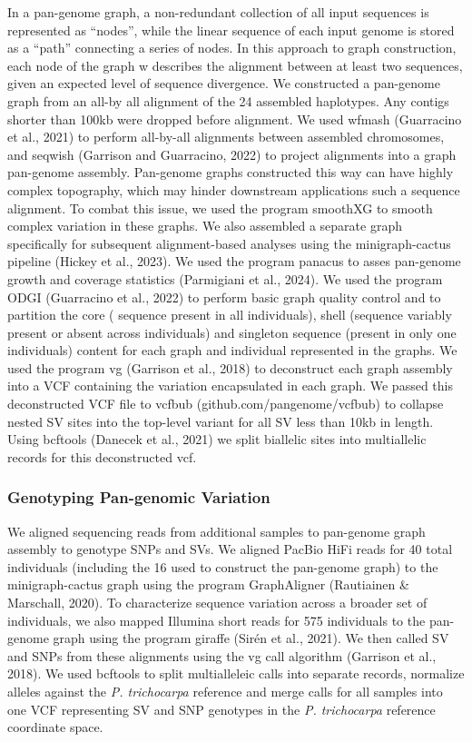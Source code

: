 \documentclass[
]{agujournal2019}
\begin{document}
In a pan-genome graph, a non-redundant collection of all input sequences
is represented as ``nodes'', while the linear sequence of each input
genome is stored as a ``path'' connecting a series of nodes. In this
approach to graph construction, each node of the graph w describes the
alignment between at least two sequences, given an expected level of
sequence divergence. We constructed a pan-genome graph from an all-by
all alignment of the 24 assembled haplotypes. Any contigs shorter than
100kb were dropped before alignment. We used wfmash (Guarracino et al.,
2021) to perform all-by-all alignments between assembled chromosomes,
and seqwish (Garrison and Guarracino, 2022) to project alignments into a
graph pan-genome assembly. Pan-genome graphs constructed this way can
have highly complex topography, which may hinder downstream applications
such a sequence alignment. To combat this issue, we used the program
smoothXG to smooth complex variation in these graphs. We also assembled
a separate graph specifically for subsequent alignment-based analyses
using the minigraph-cactus pipeline (Hickey et al., 2023). We used the
program panacus to asses pan-genome growth and coverage statistics
(Parmigiani et al., 2024). We used the program ODGI (Guarracino et al.,
2022) to perform basic graph quality control and to partition the core (
sequence present in all individuals), shell (sequence variably present
or absent across individuals) and singleton sequence (present in only
one individuals) content for each graph and individual represented in
the graphs. We used the program vg (Garrison et al., 2018) to
deconstruct each graph assembly into a VCF containing the variation
encapsulated in each graph. We passed this deconstructed VCF file to
vcfbub (github.com/pangenome/vcfbub) to collapse nested SV sites into
the top-level variant for all SV less than 10kb in length. Using
bcftools (Danecek et al., 2021) we split biallelic sites into
multiallelic records for this deconstructed vcf.

\subsubsection{Genotyping Pan-genomic
Variation}\label{genotyping-pan-genomic-variation}

We aligned sequencing reads from additional samples to pan-genome graph
assembly to genotype SNPs and SVs. We aligned PacBio HiFi reads for 40
total individuals (including the 16 used to construct the pan-genome
graph) to the minigraph-cactus graph using the program GraphAligner
(Rautiainen \& Marschall, 2020). To characterize sequence variation
across a broader set of individuals, we also mapped Illumina short reads
for 575 individuals to the pan-genome graph using the program giraffe
(Sirén et al., 2021). We then called SV and SNPs from these alignments
using the vg call algorithm (Garrison et al., 2018). We used bcftools to
split multialleleic calls into separate records, normalize alleles
against the \emph{P. trichocarpa} reference and merge calls for all
samples into one VCF representing SV and SNP genotypes in the \emph{P.
trichocarpa} reference coordinate space.
\end{document}
